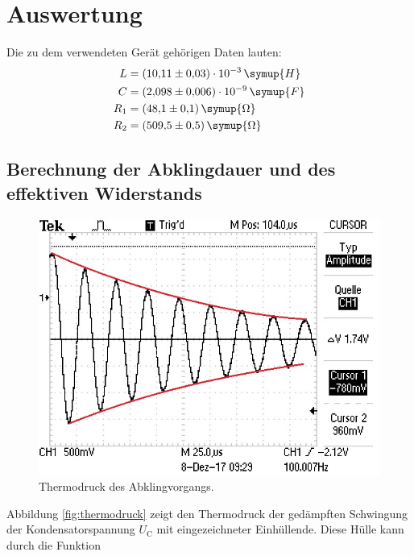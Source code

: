\section{Auswertung}
Die zu dem verwendeten Gerät gehörigen Daten lauten:
\begin{equation*}
\begin{aligned}
L   &= (10{,}11 \pm 0{,}03)\cdot 10^{-3}\,\symup{H} \\
C   &= (2{,}098 \pm 0{,}006)\cdot 10^{-9}\, \symup{F} \\
R_1 &= (48{,}1   \pm 0{,}1)   \, \symup{\Omega} \\
R_2 &= (509{,}5  \pm 0{,}5)   \, \symup{\Omega}
\end{aligned}
\end{equation*}

\subsection{Berechnung der Abklingdauer und des effektiven Widerstands}

\begin{figure}[h!]
	\centering
	\includegraphics[width=0.7\linewidth]{Einhuellende.jpg}
	\caption{Thermodruck des Abklingvorgangs.}
	\label{fig:thermodruck}
\end{figure}

Abbildung \eqref{fig:thermodruck} zeigt den Thermodruck der gedämpften Schwingung der Kondensatorspannung $U_{\text{C}}$ mit eingezeichneter Einhüllende.
Diese Hülle kann durch die Funktion

